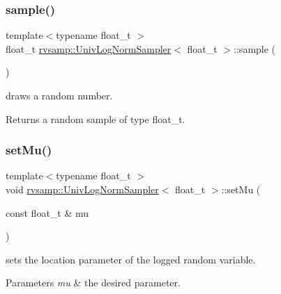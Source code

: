 \subsubsection{\texorpdfstring{sample()}{sample()}}
{\footnotesize\ttfamily template$<$typename float\+\_\+t $>$ \\
float\+\_\+t \hyperlink{classrvsamp_1_1UnivLogNormSampler}{rvsamp\+::\+Univ\+Log\+Norm\+Sampler}$<$ float\+\_\+t $>$\+::sample (\begin{DoxyParamCaption}{ }\end{DoxyParamCaption})}



draws a random number. 

\begin{DoxyReturn}{Returns}
a random sample of type float\+\_\+t. 
\end{DoxyReturn}
\mbox{\label{classrvsamp_1_1UnivLogNormSampler_a43c00fb2c560c1444ccdee13060c5153}} 
\subsubsection{\texorpdfstring{set\+Mu()}{setMu()}}
{\footnotesize\ttfamily template$<$typename float\+\_\+t $>$ \\
void \hyperlink{classrvsamp_1_1UnivLogNormSampler}{rvsamp\+::\+Univ\+Log\+Norm\+Sampler}$<$ float\+\_\+t $>$\+::set\+Mu (\begin{DoxyParamCaption}\item[{const float\+\_\+t \&}]{mu }\end{DoxyParamCaption})}



sets the location parameter of the logged random variable. 


\begin{DoxyParams}{Parameters}
{\em mu} & the desired parameter. \\
\hline
\end{DoxyParams}
\mbox{\label{classrvsamp_1_1UnivLogNormSampler_a21bdbf5f20b327f5905605dd0357c8b8}} 
